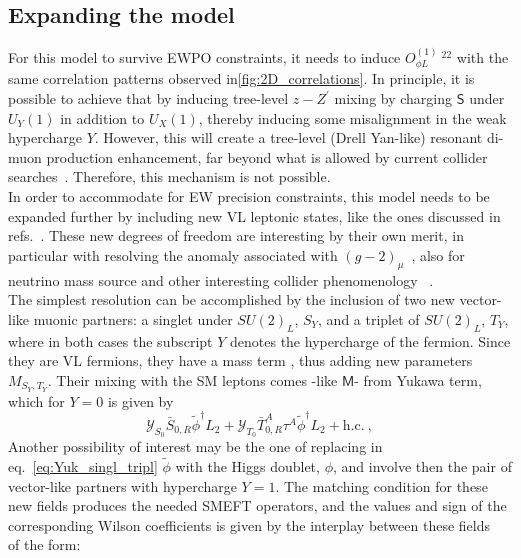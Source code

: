 \subsection{Expanding the model}
For this model to survive EWPO constraints, it needs to induce  $O_{\phi L}^{(1)}\ ^{22}$ with the same correlation patterns observed in\autoref{fig:2D_correlations}.  In principle, it is possible to achieve that by inducing tree-level $z-Z^\prime$ mixing by charging $\mathsf{S}$ under $U_Y(1)$ in addition to $U_X(1)$, thereby inducing some misalignment in the weak hypercharge $Y$. However, this will create a tree-level (Drell Yan-like) resonant di-muon production enhancement, far beyond what is allowed by current collider searches~\cite{ATLAS-CONF-2019-001}.  Therefore, this mechanism is not possible. \\ In order to accommodate for EW precision constraints, this model needs to be expanded further by including new VL leptonic states, like the ones discussed in refs.~\cite{Thomas:1998wy,delAguila:2008pw}. These new degrees of freedom are interesting by their own merit, in particular with resolving the anomaly associated with $(g-2)_{\mu}$~\cite{Kannike:2011ng,Muong-2:2021ojo}, also for neutrino mass source and other interesting collider phenomenology ~\cite{Kumar:2015tna,Bhattiprolu:2019vdu}.\\ 
The simplest resolution can be accomplished by the inclusion of  two new vector-like muonic partners: a singlet under $SU(2)_{L}$, $S_{Y}$, and a triplet of $SU(2)_{L}$, $T_{Y}$, 
where in both cases the subscript $Y$ denotes the hypercharge of the fermion. Since they are VL fermions, they have a mass term , thus adding new parameters~$M_{S_{Y},T_{Y}}$. Their mixing with the SM leptons comes -like $\mathsf{M}$- from Yukawa term, which for $Y=0$ is given by
\begin{equation}
	\label{eq:Yuk_singl_tripl}
	\mathcal{Y}_{S_{0}} \bar{S}_{0,R} \tilde{\phi}^{\dagger} L_{2} + \mathcal{Y}_{T_{0}} \bar{T}^{A}_{0,R} \tau^{A} \tilde{\phi}^{\dagger} L_{2} + \textrm{h.c.}  \ ,
\end{equation} 
Another possibility of interest may be the one of replacing in eq.~\eqref{eq:Yuk_singl_tripl} $\tilde{\phi} $
with the Higgs doublet, $\phi$, and involve then the pair of vector-like partners with hypercharge $Y=1$.  The matching condition for these new fields produces the needed SMEFT operators, and the values and sign of the corresponding Wilson coefficients is given by the interplay between these fields ~\cite{delAguila:2008pw,Kannike:2011ng} of the form:
